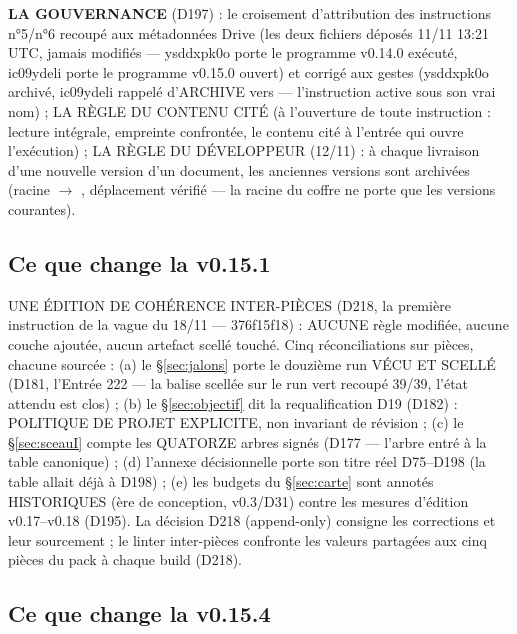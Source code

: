 \textbf{LA GOUVERNANCE} (D197) : le croisement d'attribution des
instructions n°5/n°6 recoupé aux métadonnées Drive (les deux fichiers
déposés 11/11 13:21 UTC, jamais modifiés — ysddxpk0o porte le programme
v0.14.0 exécuté, ic09ydeli porte le programme v0.15.0 ouvert) et
corrigé aux gestes (ysddxpk0o archivé, ic09ydeli rappelé d'ARCHIVE
vers  — l'instruction active sous son vrai nom) ;
LA RÈGLE DU CONTENU CITÉ (à l'ouverture de toute instruction : lecture
intégrale, empreinte confrontée, le contenu cité à l'entrée qui ouvre
l'exécution) ; LA RÈGLE DU DÉVELOPPEUR (12/11) : à chaque livraison
d'une nouvelle version d'un document, les anciennes versions sont
archivées (racine $\to$ , déplacement vérifié — la
racine du coffre ne porte que les versions courantes).

\subsection{Ce que change la v0.15.1}\label{sec:nouveautes151}

UNE ÉDITION DE COHÉRENCE INTER-PIÈCES (D218, la première instruction
de la vague du 18/11 — 376f15f18) : AUCUNE règle modifiée, aucune
couche ajoutée, aucun artefact scellé touché. Cinq réconciliations sur
pièces, chacune sourcée : (a) le §\ref{sec:jalons} porte le douzième
run VÉCU ET SCELLÉ (D181, l'Entrée 222 — la balise 
scellée sur le run vert recoupé 39/39, l'état attendu est clos) ;
(b) le §\ref{sec:objectif} dit la requalification D19 (D182) :
POLITIQUE DE PROJET EXPLICITE, non invariant de révision ; (c) le
§\ref{sec:sceauI} compte les QUATORZE arbres signés (D177 — l'arbre
 entré à la table canonique) ; (d) l'annexe décisionnelle
porte son titre réel D75--D198 (la table allait déjà à D198) ; (e) les
budgets du §\ref{sec:carte} sont annotés HISTORIQUES (ère de
conception, v0.3/D31) contre les mesures d'édition v0.17--v0.18
(D195). La décision D218 (append-only) consigne les corrections et
leur sourcement ; le linter inter-pièces confronte les valeurs
partagées aux cinq pièces du pack à chaque build (D218).

\subsection{Ce que change la v0.15.4}\label{sec:nouveautes154}

